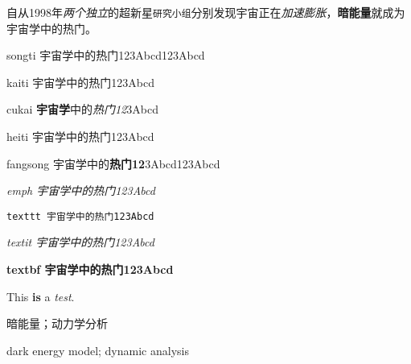 

\begin{zhaiyao}
\begin{spacing}{1.5}
{
{

{\songti 自从}1998年\emph{两个独立}的超新星\texttt{研究小组}分别发现宇宙正在\textit{加速膨胀}，\textbf{暗能量}就成为{\fangsong 宇宙学中的热门}。

{\songti songti 宇宙学中的热门123Abcd123Abcd}


{\kaiti kaiti 宇宙学中的热门123Abcd}

{\cukai cukai \textbf{宇宙学}中的\textit{热门12}3Abcd}

{\heiti heiti 宇宙学中的热门}{123Abcd}

{\fangsong fangsong 宇宙学中的\textbf{热门12}3Abcd123Abcd}

{\emph{emph 宇宙学中的热门123Abcd}}

{\texttt{texttt 宇宙学中的热门1{23Abcd}}}

{\textit{textit 宇宙学中的热门123Abcd}}

{\textbf{textbf 宇宙学中的热门123Abcd}}


This \textbf{is} a \textit{test}.
}
}

\end{spacing}
\end{zhaiyao}




\begin{guanjianci}
暗能量；动力学分析
\end{guanjianci}



\begin{abstract}
\begin{spacing}{1.5}
Since 1998, two independent supernova research groups have discovered that the universe is accelerating, and the dark energy has become a hot topic in cosmology. 

\end{spacing}
\end{abstract}


\begin{keywords}
dark energy model; dynamic analysis
\end{keywords} 